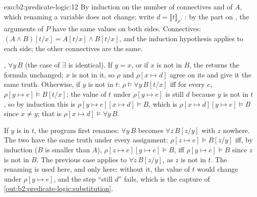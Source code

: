 \begin{solution}{exo:b2:predicate-logic:12}
By induction on the number of connectives and  of $A$, which renaming a variable does not change; write $d =
\llbracket t \rrbracket_\rho$. : by the part on , the arguments of $P$ have the same values on both
sides. Connectives: $(A \wedge B)[t/x] = A[t/x] \wedge B[t/x]$, and the induction hypothesis applies to each side;
the other connectives are the same.

, $\forall y\, B$ (the case of $\exists$ is identical). If $y = x$, or if $x$ is not  in $B$, the
 returns the formula unchanged; $x$ is not  in it, so $\rho$ and $\rho[x \mapsto d]$ agree on its  and give it the same truth. Otherwise, if $y$ is not  in $t$:
$\rho \models \forall y\, B[t/x]$ iff for every $e$, $\rho[y \mapsto e] \models B[t/x]$; the value of $t$ under $\rho[y
\mapsto e]$ is still $d$ because $y$ is not in $t$, so by induction this is $\rho[y \mapsto e][x \mapsto d] \models
B$, which is $\rho[x \mapsto d][y \mapsto e] \models B$ since $x \neq y$; that is $\rho[x \mapsto d] \models \forall y\,
B$.

If $y$ is  in $t$, the program first renames: $\forall y\, B$ becomes $\forall z\, B[z/y]$ with $z$  nowhere.
The two have the same truth under every assignment: $\rho[z \mapsto e] \models B[z/y]$ iff, by induction ($B$ is
smaller than $A$), $\rho[z \mapsto e][y \mapsto e] \models B$, iff $\rho[y \mapsto e] \models B$ since $z$ is not 
in $B$. The previous case applies to $\forall z\, B[z/y]$, as $z$ is not in $t$. The renaming is used here, and only
here: without it, the value of $t$ would change under $\rho[y \mapsto e]$, and the step ``still $d$'' fails, which is
the capture of \cref{out:b2:predicate-logic:substitution}.
\end{solution}

